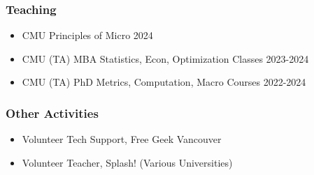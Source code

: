 \documentclass[12pt]{article}   %
\begin{document}

\subsubsection*{Teaching}
\begin{itemize}
  \item CMU \hspace{9.5 em} Principles of Micro \hfill 2024
  \item CMU (TA) \hspace{7 em} MBA Statistics, Econ, Optimization Classes \hfill 2023-2024
  \item CMU (TA) \hspace{7 em} PhD Metrics, Computation, Macro Courses \hfill 2022-2024
\end{itemize}




\subsubsection*{Other Activities}
\begin{itemize}
  \item Volunteer Tech Support, Free Geek Vancouver 
  
  \item Volunteer Teacher, Splash! (Various Universities)
  
\end{itemize}
\end{document}
